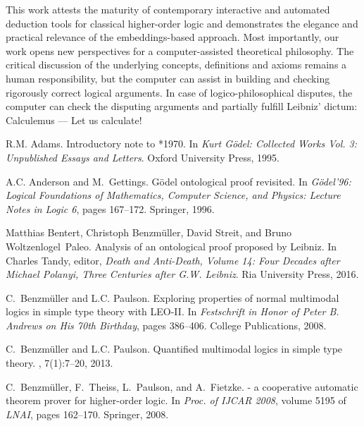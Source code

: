 \documentclass{llncs}
\begin{document}
This work attests the maturity of contemporary interactive and
automated deduction tools for classical higher-order logic and
demonstrates the elegance and practical relevance of the
embeddings-based approach.  Most importantly, our work opens new
perspectives for a computer-assisted theoretical philosophy.  The
critical discussion of the underlying concepts, definitions and axioms
remains a human responsibility, but the computer can assist in
building and checking rigorously correct logical arguments. In case of
logico-philosophical disputes, the computer can check the disputing
arguments and partially fulfill Leibniz' dictum: Calculemus --- Let us
calculate!

\footnotesize

\begin{thebibliography}{10}

R.M. Adams.
\newblock Introductory note to *1970.
\newblock In {\em {Kurt G\"odel: Collected Works Vol. 3: Unpublished Essays and
  Letters}}. Oxford University Press, 1995.

A.C. Anderson and M.~Gettings.
\newblock G\"odel ontological proof revisited.
\newblock In {\em {G\"odel'96: Logical Foundations of Mathematics, Computer
  Science, and Physics: Lecture Notes in Logic 6}}, pages 167--172. {Springer},
  1996.

Matthias Bentert, Christoph Benzm{\"u}ller, David Streit, and Bruno
  Woltzenlogel~Paleo.
\newblock Analysis of an ontological proof proposed by {Leibniz}.
\newblock In Charles Tandy, editor, {\em Death and Anti-Death, Volume 14: Four
  Decades after Michael Polanyi, Three Centuries after G.W. Leibniz}. Ria
  University Press, 2016.

C.~Benzm{\"u}ller and L.C. Paulson.
\newblock Exploring properties of normal multimodal logics in simple type
  theory with {LEO-II}.
\newblock In {\em {Festschrift in Honor of {Peter B. Andrews} on His 70th
  Birthday}}, pages 386--406. College Publications, 2008.

C.~Benzm{\"u}ller and L.C. Paulson.
\newblock Quantified multimodal logics in simple type theory.
,
  7(1):7--20, 2013.

C.~Benzm{\"u}ller, F.~Theiss, L.~Paulson, and A.~Fietzke.
 - a cooperative automatic theorem prover for higher-order
  logic.
\newblock In {\em Proc. of IJCAR 2008}, volume 5195 of {\em LNAI}, pages
  162--170. Springer, 2008.


\end{thebibliography}
\end{document}

